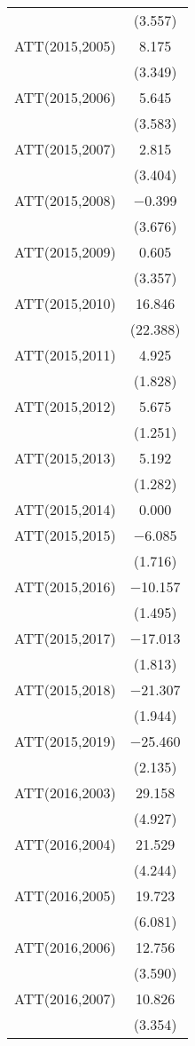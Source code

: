 \begin{table}
\begin{tabular}[t]{lc}
 & (\num{3.557})\\
ATT(2015,2005) & \num{8.175}\\
 & (\num{3.349})\\
ATT(2015,2006) & \num{5.645}\\
 & (\num{3.583})\\
ATT(2015,2007) & \num{2.815}\\
 & (\num{3.404})\\
ATT(2015,2008) & \num{-0.399}\\
 & (\num{3.676})\\
ATT(2015,2009) & \num{0.605}\\
 & (\num{3.357})\\
ATT(2015,2010) & \num{16.846}\\
 & (\num{22.388})\\
ATT(2015,2011) & \num{4.925}\\
 & (\num{1.828})\\
ATT(2015,2012) & \num{5.675}\\
 & (\num{1.251})\\
ATT(2015,2013) & \num{5.192}\\
 & (\num{1.282})\\
ATT(2015,2014) & \num{0.000}\\
ATT(2015,2015) & \num{-6.085}\\
 & (\num{1.716})\\
ATT(2015,2016) & \num{-10.157}\\
 & (\num{1.495})\\
ATT(2015,2017) & \num{-17.013}\\
 & (\num{1.813})\\
ATT(2015,2018) & \num{-21.307}\\
 & (\num{1.944})\\
ATT(2015,2019) & \num{-25.460}\\
 & (\num{2.135})\\
ATT(2016,2003) & \num{29.158}\\
 & (\num{4.927})\\
ATT(2016,2004) & \num{21.529}\\
 & (\num{4.244})\\
ATT(2016,2005) & \num{19.723}\\
 & (\num{6.081})\\
ATT(2016,2006) & \num{12.756}\\
 & (\num{3.590})\\
ATT(2016,2007) & \num{10.826}\\
 & (\num{3.354})\\

\end{tabular}
\end{table}

